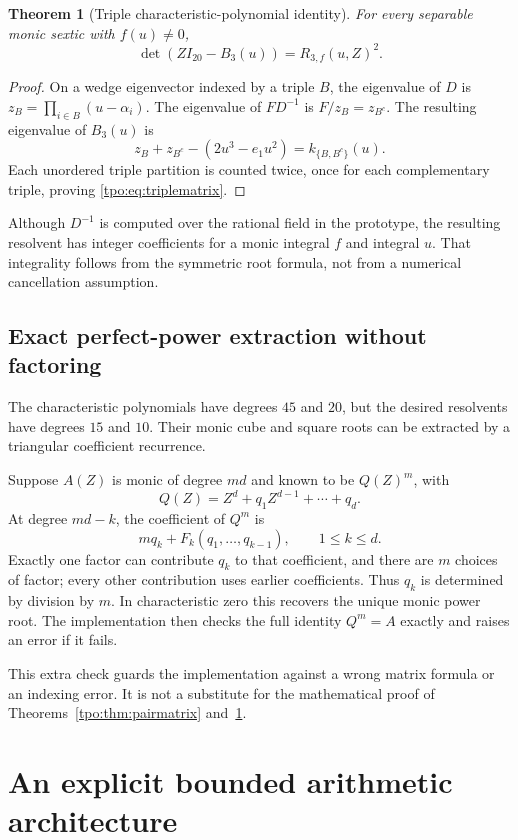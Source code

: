 \documentclass[11pt,letterpaper]{article}
\numberwithin{equation}{section}
\newtheorem{theorem}{Theorem}[section]
\theoremstyle{definition}
\theoremstyle{remark}
\newcommand{\Rthree}{R_{3,f}}
\begin{document}
\begin{theorem}[Triple characteristic-polynomial identity]
\label{tpo:thm:triplematrix}
For every separable monic sextic with $f(u)\ne0$,
\begin{equation}
 \det(ZI_{20}-B_3(u))=\Rthree(u,Z)^2.
 \label{tpo:eq:triplematrix}
\end{equation}
\end{theorem}
\begin{proof}
On a wedge eigenvector indexed by a triple $B$, the eigenvalue of $D$ is
$z_B=\prod_{i\in B}(u-\alpha_i)$. The eigenvalue of $FD^{-1}$ is
$F/z_B=z_{B^c}$. The resulting eigenvalue of $B_3(u)$ is
\[
 z_B+z_{B^c}-(2u^3-e_1u^2)=k_{\{B,B^c\}}(u).
\]
Each unordered triple partition is counted twice, once for each complementary
triple, proving \eqref{tpo:eq:triplematrix}.
\end{proof}

Although $D^{-1}$ is computed over the rational field in the prototype, the
resulting resolvent has integer coefficients for a monic integral $f$ and
integral $u$. That integrality follows from the symmetric root formula, not
from a numerical cancellation assumption.

\subsection{Exact perfect-power extraction without factoring}
The characteristic polynomials have degrees $45$ and $20$, but the desired
resolvents have degrees $15$ and $10$. Their monic cube and square roots can
be extracted by a triangular coefficient recurrence.

Suppose $A(Z)$ is monic of degree $md$ and known to be $Q(Z)^m$, with
\[
 Q(Z)=Z^d+q_1Z^{d-1}+\cdots+q_d.
\]
At degree $md-k$, the coefficient of $Q^m$ is
\[
 m q_k+F_k(q_1,\ldots,q_{k-1}),\qquad 1\le k\le d.
\]
Exactly one factor can contribute $q_k$ to that coefficient, and there are
$m$ choices of factor; every other contribution uses earlier coefficients.
Thus $q_k$ is determined by division by $m$. In characteristic zero this
recovers the unique monic power root. The implementation then checks the full
identity $Q^m=A$ exactly and raises an error if it fails.

This extra check guards the implementation against a wrong matrix formula or
an indexing error. It is not a substitute for the mathematical proof of
Theorems~\ref{tpo:thm:pairmatrix} and~\ref{tpo:thm:triplematrix}.

\section{An explicit bounded arithmetic architecture}
\label{tpo:sec:algorithm}
\end{document}
